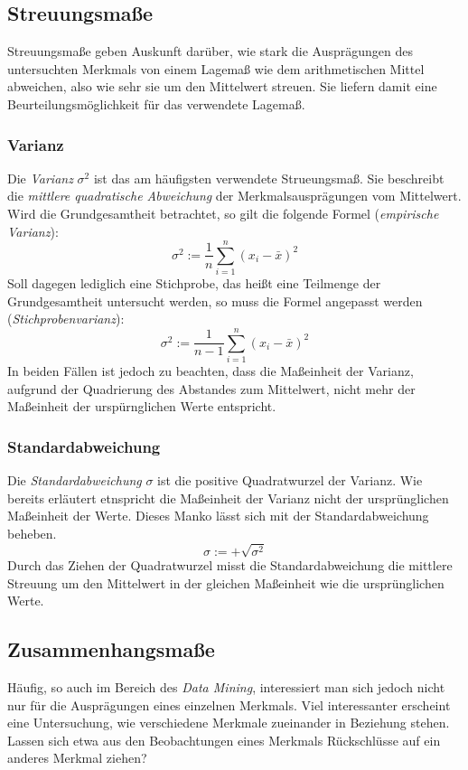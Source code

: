 \documentclass[fontsize=11pt]{scrartcl}
\begin{document}
                \subsection{Streuungsmaße}
                    Streuungsmaße geben Auskunft darüber, wie stark die Ausprägungen des untersuchten Merkmals von einem Lagemaß wie dem arithmetischen Mittel abweichen, also wie sehr sie um den Mittelwert streuen. Sie liefern damit eine Beurteilungsmöglichkeit für das verwendete Lagemaß.\cite{ertel2016,kohn2005}
                    \subsubsection{Varianz}
                        Die \emph{Varianz} $\sigma^2$ ist das am häufigsten verwendete Strueungsmaß. Sie beschreibt die \emph{mittlere quadratische Abweichung} der Merkmalsausprägungen vom Mittelwert.
                        Wird die Grundgesamtheit betrachtet, so gilt die folgende Formel (\emph{empirische Varianz}): 
                        $$ \sigma^2 := \frac{1}{n}\sum_{i=1}^n(x_i - \bar{x})^2 $$
                        Soll dagegen lediglich eine Stichprobe, das heißt eine Teilmenge der Grundgesamtheit untersucht werden, so muss die Formel angepasst werden (\emph{Stichprobenvarianz}):
                        $$ \sigma^2 := \frac{1}{n-1}\sum_{i=1}^n(x_i - \bar{x})^2  $$
                        In beiden Fällen ist jedoch zu beachten, dass die Maßeinheit der Varianz, aufgrund der Quadrierung des Abstandes zum Mittelwert, nicht mehr der Maßeinheit der urspürnglichen Werte entspricht.\cite{kohn2005}
                    \subsubsection{Standardabweichung}
                        Die \emph{Standardabweichung} $\sigma$ ist die positive Quadratwurzel der Varianz. Wie bereits erläutert etnspricht die Maßeinheit der Varianz nicht der ursprünglichen Maßeinheit der Werte. Dieses Manko lässt sich mit der Standardabweichung beheben.
                        $$ \sigma := + \sqrt{\sigma^2} $$
                        Durch das Ziehen der Quadratwurzel misst die Standardabweichung die mittlere Streuung um den Mittelwert in der gleichen Maßeinheit wie die ursprünglichen Werte.\cite{kohn2005}

                \subsection{Zusammenhangsmaße}
                    Häufig, so auch im Bereich des \emph{Data Mining}, interessiert man sich jedoch nicht nur für die Ausprägungen eines einzelnen Merkmals. Viel interessanter erscheint eine Untersuchung, wie verschiedene Merkmale zueinander in Beziehung stehen. Lassen sich etwa aus den Beobachtungen eines Merkmals Rückschlüsse auf ein anderes Merkmal ziehen?
\end{document}
